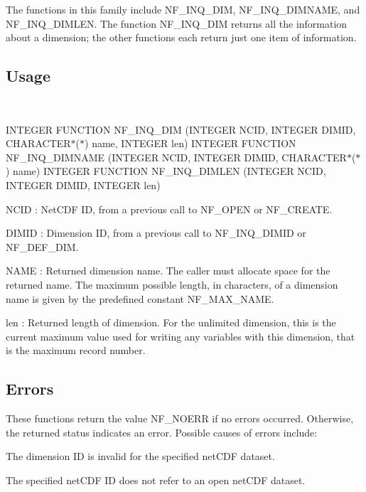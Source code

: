 The functions in this family include N\+F\+\_\+\+I\+N\+Q\+\_\+\+D\+IM, N\+F\+\_\+\+I\+N\+Q\+\_\+\+D\+I\+M\+N\+A\+ME, and N\+F\+\_\+\+I\+N\+Q\+\_\+\+D\+I\+M\+L\+EN. The function N\+F\+\_\+\+I\+N\+Q\+\_\+\+D\+IM returns all the information about a dimension; the other functions each return just one item of information.

\subsection*{Usage }

 

I\+N\+T\+E\+G\+ER F\+U\+N\+C\+T\+I\+ON N\+F\+\_\+\+I\+N\+Q\+\_\+\+D\+IM (I\+N\+T\+E\+G\+ER N\+C\+ID, I\+N\+T\+E\+G\+ER D\+I\+M\+ID, C\+H\+A\+R\+A\+C\+T\+E\+R$\ast$($\ast$) name, I\+N\+T\+E\+G\+ER len) I\+N\+T\+E\+G\+ER F\+U\+N\+C\+T\+I\+ON N\+F\+\_\+\+I\+N\+Q\+\_\+\+D\+I\+M\+N\+A\+ME (I\+N\+T\+E\+G\+ER N\+C\+ID, I\+N\+T\+E\+G\+ER D\+I\+M\+ID, C\+H\+A\+R\+A\+C\+T\+E\+R$\ast$($\ast$) name) I\+N\+T\+E\+G\+ER F\+U\+N\+C\+T\+I\+ON N\+F\+\_\+\+I\+N\+Q\+\_\+\+D\+I\+M\+L\+EN (I\+N\+T\+E\+G\+ER N\+C\+ID, I\+N\+T\+E\+G\+ER D\+I\+M\+ID, I\+N\+T\+E\+G\+ER len)

{\ttfamily N\+C\+ID} \+: Net\+C\+DF ID, from a previous call to N\+F\+\_\+\+O\+P\+EN or N\+F\+\_\+\+C\+R\+E\+A\+TE.

{\ttfamily D\+I\+M\+ID} \+: Dimension ID, from a previous call to N\+F\+\_\+\+I\+N\+Q\+\_\+\+D\+I\+M\+ID or N\+F\+\_\+\+D\+E\+F\+\_\+\+D\+IM.

{\ttfamily N\+A\+ME} \+: Returned dimension name. The caller must allocate space for the returned name. The maximum possible length, in characters, of a dimension name is given by the predefined constant N\+F\+\_\+\+M\+A\+X\+\_\+\+N\+A\+ME.

{\ttfamily len} \+: Returned length of dimension. For the unlimited dimension, this is the current maximum value used for writing any variables with this dimension, that is the maximum record number.

\subsection*{Errors }

These functions return the value N\+F\+\_\+\+N\+O\+E\+RR if no errors occurred. Otherwise, the returned status indicates an error. Possible causes of errors include\+:


\begin{DoxyItemize}
\item The dimension ID is invalid for the specified net\+C\+DF dataset.
\item The specified net\+C\+DF ID does not refer to an open net\+C\+DF dataset.
\end{DoxyItemize}

